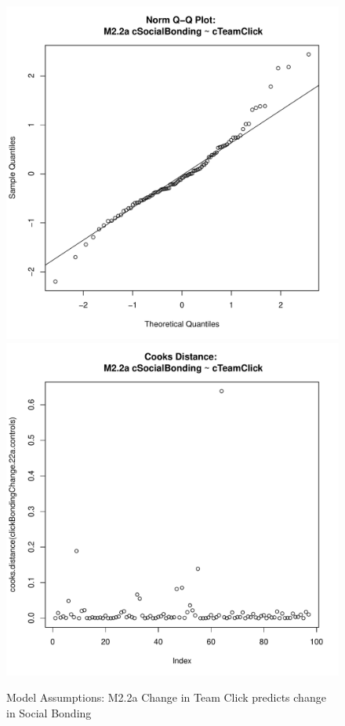 \documentclass[12pt]{report}
\begin{document}
{\begin{figure}[htbp]
  \includegraphics[scale =.4]{../images/MLM22aQQNorm.pdf}
  \includegraphics[scale =.4]{../images/MLM22aCooksD.pdf}
  \caption{Model Assumptions: M2.2a Change in Team Click predicts change in Social Bonding}
  \label{fig:MLM22aAssumptions}
\end{figure}


}
\end{document}
